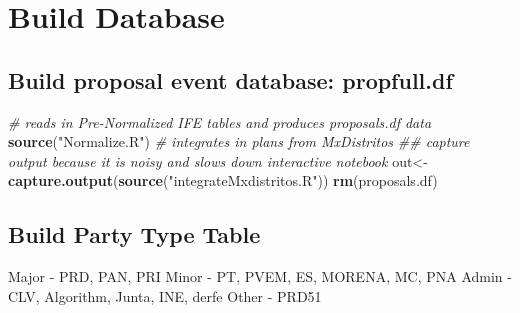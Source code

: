 \documentclass[
]{article}
\newenvironment{Shaded}{\begin{snugshade}}{\end{snugshade}}
\newcommand{\CommentTok}[1]{\textcolor[rgb]{0.56,0.35,0.01}{\textit{#1}}}
\newcommand{\KeywordTok}[1]{\textcolor[rgb]{0.13,0.29,0.53}{\textbf{#1}}}
\newcommand{\NormalTok}[1]{#1}
\newcommand{\StringTok}[1]{\textcolor[rgb]{0.31,0.60,0.02}{#1}}
\begin{document}
\hypertarget{build-database}{%
\section{Build Database}\label{build-database}}

\hypertarget{build-proposal-event-database-propfull.df}{%
\subsection{Build proposal event database:
propfull.df}\label{build-proposal-event-database-propfull.df}}

\begin{Shaded}
\begin{Highlighting}[]
\CommentTok{# reads in Pre-Normalized IFE tables and produces proposals.df data}
\KeywordTok{source}\NormalTok{(}\StringTok{"Normalize.R"}\NormalTok{)}
\CommentTok{# integrates in plans from MxDistritos}
\CommentTok{## capture output because it is noisy and slows down interactive notebook}
\NormalTok{out<-}\KeywordTok{capture.output}\NormalTok{(}\KeywordTok{source}\NormalTok{(}\StringTok{"integrateMxdistritos.R"}\NormalTok{))}
\KeywordTok{rm}\NormalTok{(proposals.df)}
\end{Highlighting}
\end{Shaded}

\hypertarget{build-party-type-table}{%
\subsection{Build Party Type Table}\label{build-party-type-table}}

Major - PRD, PAN, PRI Minor - PT, PVEM, ES, MORENA, MC, PNA Admin - CLV,
Algorithm, Junta, INE, derfe Other - PRD51
\end{document}
